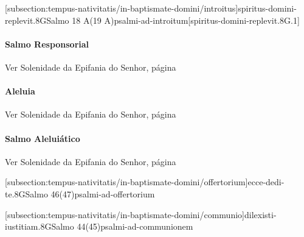 \def\Prefix{subsection:tempus-nativitatis/in-baptismate-domini}

[\Prefix/introitus]{spiritus-domini-replevit.8G}{Salmo 18 A(19 A)}{psalmi-ad-introitum}[spiritus-domini-replevit.8G.1]

\paragraph{Salmo Responsorial}
\begin{rubrica}
  Ver Solenidade da Epifania do Senhor, página~\pageref{subsection:tempus-nativitatis/in-epiphania-domini/psalmus-responsorius}
\end{rubrica}

\paragraph{Aleluia}
\begin{rubrica}
  Ver Solenidade da Epifania do Senhor, página~\pageref{subsection:tempus-nativitatis/in-epiphania-domini/alleluia}
\end{rubrica}

\paragraph{Salmo Aleluiático}
\begin{rubrica}
  Ver Solenidade da Epifania do Senhor, página~\pageref{subsection:tempus-nativitatis/in-epiphania-domini/psalmus-alleluiaticus}
\end{rubrica}

[\Prefix/offertorium]{ecce-dedi-te.8G}{Salmo 46(47)}{psalmi-ad-offertorium}

\AllowPageFlush

[\Prefix/communio]{dilexisti-iustitiam.8G}{Salmo 44(45)}{psalmi-ad-communionem}